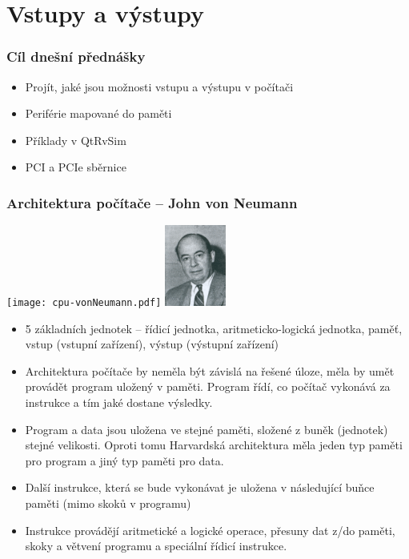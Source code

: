 \documentclass{beamer}
\subtitle{Lekce 07. Vstup a výstup}
\author{Pavel Píša \phantom{xxxxxxxxx} Petr Štěpán \\ \small\texttt{pisa@fel.cvut.cz}\phantom{xxxx}\small\texttt{stepan@fel.cvut.cz}}
\begin{document}
\maketitle

\section{Vstupy a výstupy}

\begin{frame}
\frametitle{Cíl dnešní přednášky}

\begin{itemize}
 \item Projít, jaké jsou možnosti vstupu a výstupu v počítači
 \item Periférie mapované do paměti
 \item Příklady v QtRvSim
 \item PCI a PCIe sběrnice
\end{itemize}
\end{frame}


\begin{frame}[shrink=10]
\frametitle{Architektura počítače -- John von Neumann}
\begin{center}
\texttt{[image: cpu-vonNeumann.pdf]}
\hfill
\includegraphics[width=0.15\textwidth]{fig/vonNeumann.png}
\end{center}
\begin{itemize}
\item 5 základních jednotek – řídicí jednotka, aritmeticko-logická jednotka, paměť, vstup (vstupní zařízení), výstup (výstupní zařízení)
\item Architektura počítače by neměla být závislá na řešené úloze, měla by umět provádět program uložený v paměti. Program řídí, co počítač vykonává za instrukce a tím jaké dostane výsledky.
\item Program a data jsou uložena ve stejné paměti, složené z buněk (jednotek) stejné velikosti. Oproti tomu Harvardská architektura měla jeden typ paměti pro program a jiný typ paměti pro data.
\item Další instrukce, která se bude vykonávat je uložena v následující buňce paměti (mimo skoků v programu)
\item Instrukce provádějí aritmetické a logické operace, přesuny dat z/do paměti, skoky a větvení programu a speciální řídicí instrukce.
\end{itemize}
\end{frame}
\end{document}
